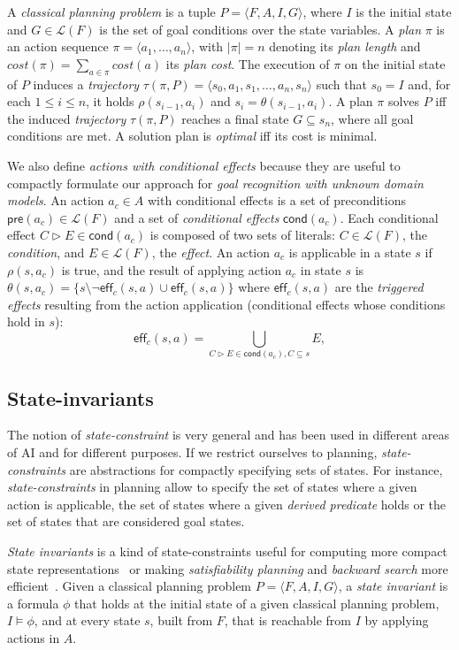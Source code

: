 \documentclass{article}
\newcommand{\tup}[1]{{\langle #1 \rangle}}
\newcommand{\pre}{\mathsf{pre}}     %
\newcommand{\eff}{\mathsf{eff}}     %
\newcommand{\cond}{\mathsf{cond}}   %
\begin{document}
A {\em classical planning problem} is a tuple $P=\tup{F,A,I,G}$, where $I$ is the initial state and $G\in\mathcal{L}(F)$ is the set of goal conditions over the state variables. A {\em plan} $\pi$ is an action sequence $\pi=\tup{a_1, \ldots, a_n}$, with $|\pi|=n$ denoting its {\em plan length} and $cost(\pi)=\sum_{a\in\pi} cost(a)$ its {\em plan cost}. The execution of $\pi$ on the initial state of $P$ induces a {\em trajectory} $\tau(\pi,P)=\tup{s_0, a_1, s_1, \ldots, a_n, s_n}$ such that $s_0=I$ and, for each {\small $1\leq i\leq n$}, it holds $\rho(s_{i-1},a_i)$ and $s_i=\theta(s_{i-1},a_i)$. A plan $\pi$ solves $P$ iff the induced {\em trajectory} $\tau(\pi,P)$ reaches a final state $G \subseteq s_n$, where all goal conditions are met. A solution plan is {\em optimal} iff its cost is minimal.

We also define {\em actions with conditional effects} because they are useful to compactly formulate our approach for {\em goal recognition with unknown domain models}. An action $a_c\in A$ with conditional effects is a set of preconditions $\pre(a_c)\in\mathcal{L}(F)$ and a set of {\em conditional effects} $\cond(a_c)$. Each conditional effect $C\rhd E\in\cond(a_c)$ is composed of two sets of literals: $C\in\mathcal{L}(F)$, the {\em condition}, and $E\in\mathcal{L}(F)$, the {\em effect}. An action $a_c$ is applicable in a state $s$ if $\rho(s,a_c)$ is true, and the result of applying action $a_c$ in state $s$ is $\theta(s,a_c)=\{s\setminus\neg\eff_c(s,a)\cup\eff_c(s,a)\}$ where $\eff_c(s,a)$ are the {\em triggered effects} resulting from the action application (conditional effects whose conditions hold in $s$):
\[
\eff_c(s,a)=\bigcup_{C\rhd E\in\cond(a_c),C\subseteq s} E,
\]

\subsection{State-invariants}
The notion of {\em state-constraint} is very general and has been used in different areas of AI and for different purposes.  If we restrict ourselves to planning, {\em state-constraints} are abstractions for compactly specifying sets of states. For instance, {\em state-constraints} in planning allow to specify the set of states where a given action is applicable, the set of states where a given {\em derived predicate} holds or the set of states that are considered goal states.

{\em State invariants} is a kind of state-constraints useful for computing more compact state representations~\cite{helmert2009concise} or making {\em satisfiability planning} and {\em backward search} more efficient~\cite{rintanen2014madagascar,alcazar2015reminder}. Given a classical planning problem $P=\tup{F,A,I,G}$, a {\em state invariant} is a formula $\phi$ that holds at the initial state of a given classical planning problem, $I\models \phi$, and at every state $s$, built from $F$, that is reachable from $I$ by applying actions in $A$.
\end{document}
